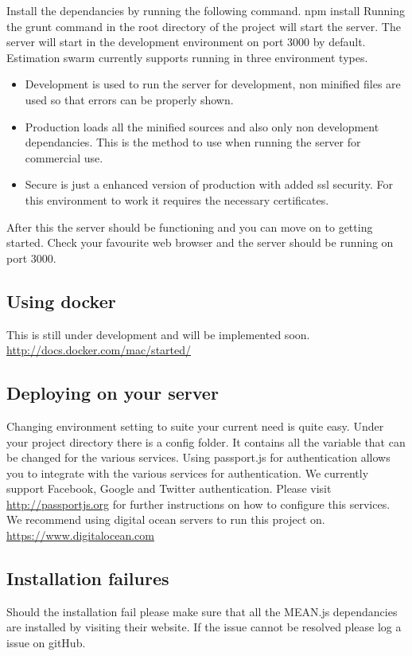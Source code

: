 \newline
Install the dependancies by running the following command.
\newline
npm install
\newline
Running the grunt command in the root directory of the project will start the server. The server will start in the development environment on port 3000 by default. Estimation swarm currently supports running in three environment types.
\begin{itemize}
	\item{Development} is used to run the server for development, non minified files are used so that errors can be properly shown.
	\item{Production} loads all the minified sources and also only non development dependancies. This is the method to use when running the server for commercial use.
	\item{Secure} is just a enhanced version of production with added ssl security. For this environment to work it requires the necessary certificates.
\end{itemize}
After this the server should be functioning and you can move on to getting started. Check your favourite web browser and the server should be running on port 3000.
\subsection{Using docker}
This is still under development and will be implemented soon.
\url{http://docs.docker.com/mac/started/}
\subsection{Deploying on your server}
Changing environment setting to suite your current need is quite easy. Under your project directory there is a config folder. It contains all the variable that can be changed for the various services. Using passport.js for authentication allows you to integrate with the various services for authentication. We currently support Facebook, Google and Twitter authentication. Please visit \url{http://passportjs.org} for further instructions on how to configure this services. We recommend using digital ocean servers to run this project on. \url{https://www.digitalocean.com}

\subsection{Installation failures}
Should the installation fail please make sure that all the MEAN.js dependancies are installed by visiting their website. If the issue cannot be resolved please log a issue on gitHub.
